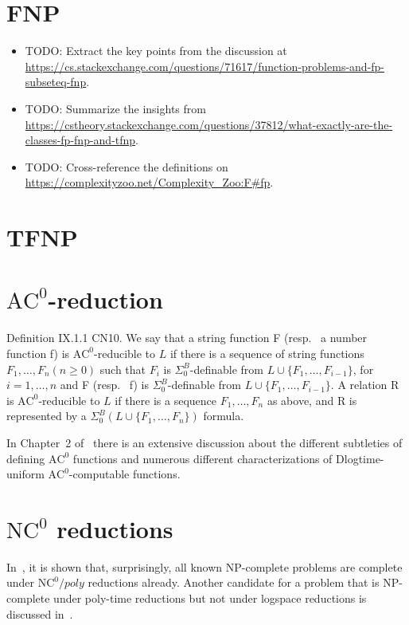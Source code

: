 \section{FNP}
\begin{itemize}
\item TODO: Extract the key points from the discussion at \url{https://cs.stackexchange.com/questions/71617/function-problems-and-fp-subseteq-fnp}.
\item TODO: Summarize the insights from \url{https://cstheory.stackexchange.com/questions/37812/what-exactly-are-the-classes-fp-fnp-and-tfnp}.
\item TODO: Cross-reference the definitions on \url{https://complexityzoo.net/Complexity_Zoo:F#fp}.
\end{itemize}


\section{TFNP}
\label{sec:complexity-class-tfnp}

\section{\texorpdfstring{$\text{AC}^0$-reduction}{AC\string^0-reduction}}
\label{sec:ac0red}
Definition IX.1.1 CN10. We say that a string function F
(resp. \  a number function f) is $\text{AC}^0$-reducible to $L$ if there is a sequence
of string functions $F_1, \dots, F_n (n \geqslant 0)$ such that
$F_i$ is $\Sigma^B_0$-definable from $L \cup \{F_1, \dots , F_{i-1}\}$, for $i = 1, \dots, n$
and F (resp. \ f) is $\Sigma^B_0$-definable from $L \cup \{F_1, \dots , F_{i-1}\}$. A relation R is
$\text{AC}^0$-reducible to $L$ if there is a sequence $F_1, \dots, F_n$ as above, and R is
represented by a $\Sigma^B_0(L \cup \{F_1, \dots, F_n\})$ formula.

In Chapter~2 of~\cite{edbd4873718c414f90d22dadf0dba2b1} there is an extensive discussion about
the different subtleties of defining $\text{AC}^0$ functions and numerous different characterizations
of Dlogtime-uniform $\text{AC}^0$-computable functions.


\section{\texorpdfstring{$\text{NC}^0$}{NC\string^0} reductions}
In~\cite{edbd4873718c414f90d22dadf0dba2b1}, it is shown that, surprisingly, all known NP-complete problems
are complete under $\text{NC}^0/poly$ reductions already. Another candidate for a problem that is NP-complete
under poly-time reductions but not under logspace reductions is discussed in~\cite{18631}.

